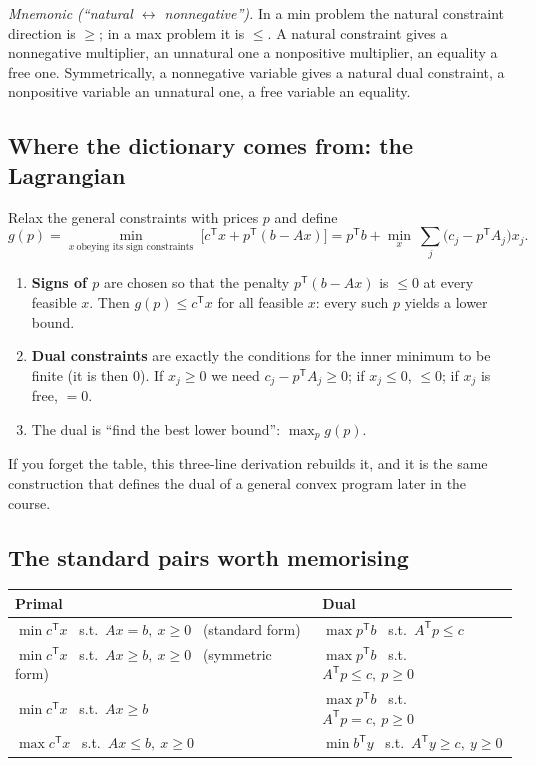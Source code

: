 \documentclass[11pt]{article}
\newcommand{\T}{^{\mathsf T}}
\theoremstyle{definition}
\theoremstyle{plain}
\theoremstyle{remark}
\begin{document}
\emph{Mnemonic (``natural $\leftrightarrow$ nonnegative'').} In a min problem the natural constraint direction is $\ge$; in a max problem it is $\le$. A natural constraint gives a nonnegative multiplier, an unnatural one a nonpositive multiplier, an equality a free one. Symmetrically, a nonnegative variable gives a natural dual constraint, a nonpositive variable an unnatural one, a free variable an equality.

\subsection{Where the dictionary comes from: the Lagrangian}
Relax the general constraints with prices $p$ and define
\[
g(p)=\min_{x\ \text{obeying its sign constraints}}\ \Big[c\T x+p\T(b-Ax)\Big]=p\T b+\min_x\ \sum_j\big(c_j-p\T A_j\big)x_j .
\]
\begin{enumerate}
\item \textbf{Signs of $p$} are chosen so that the penalty $p\T(b-Ax)$ is $\le0$ at every feasible $x$. Then $g(p)\le c\T x$ for all feasible $x$: every such $p$ yields a lower bound.
\item \textbf{Dual constraints} are exactly the conditions for the inner minimum to be finite (it is then $0$). If $x_j\ge0$ we need $c_j-p\T A_j\ge0$; if $x_j\le0$, $\le0$; if $x_j$ is free, $=0$.
\item The dual is ``find the best lower bound'': $\max_p g(p)$.
\end{enumerate}
If you forget the table, this three-line derivation rebuilds it, and it is the same construction that defines the dual of a general convex program later in the course.

\subsection{The standard pairs worth memorising}
\begin{center}\renewcommand{\arraystretch}{1.25}
\begin{tabular}{@{}ll@{}}\toprule
Primal & Dual\\ \midrule
$\min c\T x$ \ s.t.\ $Ax=b,\ x\ge0$ \ (standard form) & $\max p\T b$ \ s.t.\ $A\T p\le c$\\
$\min c\T x$ \ s.t.\ $Ax\ge b,\ x\ge0$ \ (symmetric form) & $\max p\T b$ \ s.t.\ $A\T p\le c,\ p\ge0$\\
$\min c\T x$ \ s.t.\ $Ax\ge b$ & $\max p\T b$ \ s.t.\ $A\T p=c,\ p\ge0$\\
$\max c\T x$ \ s.t.\ $Ax\le b,\ x\ge0$ & $\min b\T y$ \ s.t.\ $A\T y\ge c,\ y\ge0$\\ \bottomrule
\end{tabular}\end{center}
\end{document}
